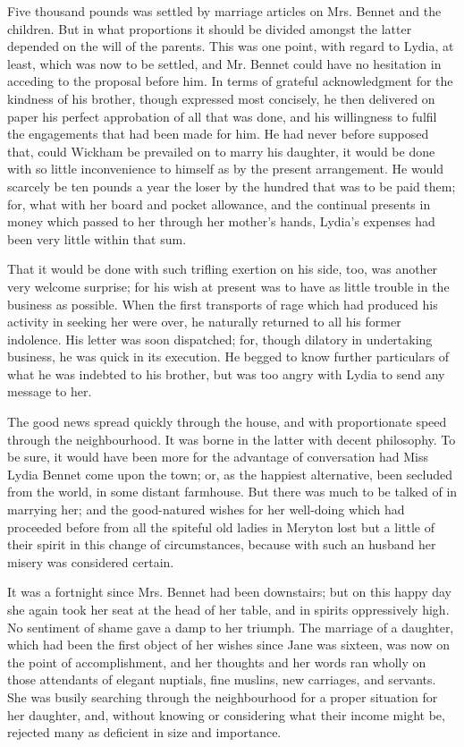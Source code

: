 Five thousand pounds was settled by marriage articles on Mrs. Bennet and the children. But in what proportions it should be divided amongst the latter depended on the will of the parents. This was one point, with regard to Lydia, at least, which was now to be settled, and Mr. Bennet could have no hesitation in acceding to the proposal before him. In terms of grateful acknowledgment for the kindness of his brother, though expressed most concisely, he then delivered on paper his perfect approbation of all that was done, and his willingness to fulfil the engagements that had been made for him. He had never before supposed that, could Wickham be prevailed on to marry his daughter, it would be done with so little inconvenience to himself as by the present arrangement. He would scarcely be ten pounds a year the loser by the hundred that was to be paid them; for, what with her board and pocket allowance, and the continual presents in money which passed to her through her mother's hands, Lydia's expenses had been very little within that sum.

That it would be done with such trifling exertion on his side, too, was another very welcome surprise; for his wish at present was to have as little trouble in the business as possible. When the first transports of rage which had produced his activity in seeking her were over, he naturally returned to all his former indolence. His letter was soon dispatched; for, though dilatory in undertaking business, he was quick in its execution. He begged to know further particulars of what he was indebted to his brother, but was too angry with Lydia to send any message to her.

The good news spread quickly through the house, and with proportionate speed through the neighbourhood. It was borne in the latter with decent philosophy. To be sure, it would have been more for the advantage of conversation had Miss Lydia Bennet come upon the town; or, as the happiest alternative, been secluded from the world, in some distant farmhouse. But there was much to be talked of in marrying her; and the good-natured wishes for her well-doing which had proceeded before from all the spiteful old ladies in Meryton lost but a little of their spirit in this change of circumstances, because with such an husband her misery was considered certain.

It was a fortnight since Mrs. Bennet had been downstairs; but on this happy day she again took her seat at the head of her table, and in spirits oppressively high. No sentiment of shame gave a damp to her triumph. The marriage of a daughter, which had been the first object of her wishes since Jane was sixteen, was now on the point of accomplishment, and her thoughts and her words ran wholly on those attendants of elegant nuptials, fine muslins, new carriages, and servants. She was busily searching through the neighbourhood for a proper situation for her daughter, and, without knowing or considering what their income might be, rejected many as deficient in size and importance.

